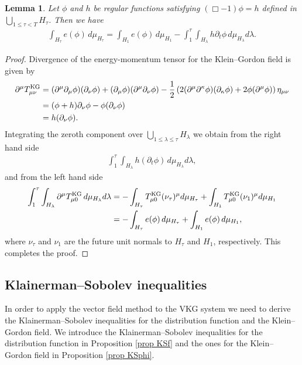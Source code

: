 \documentclass{article}
\newtheorem{lemma}{Lemma}[section]
\newcommand{\rK}{{\rm KG}}
\begin{document}
%
\begin{lemma} \label{lem chiphiest}
Let $ \phi $ and $ h $ be regular functions satisfying $ ( \Box -1 ) \phi = h $ defined in $ \bigcup_{ 1 \leq \tau < T } H_\tau $. Then we have
\begin{align*}
\int_{ H_\tau } e ( \phi ) \, d \mu_{ H_\tau } = \int_{ H_1 } e ( \phi ) \, d \mu_{ H_1 } - \int_1^\tau \int_{ H_\lambda } h \partial_t \phi \, d \mu_{ H_\lambda } d \lambda .
\end{align*}
\end{lemma}
\begin{proof}
Divergence of the energy-momentum tensor for the Klein--Gordon field is given by
\begin{align*}
\partial^\mu T^\rK_{ \mu \nu } & = ( \partial^\mu \partial_\mu \phi ) ( \partial_\nu \phi ) + ( \partial_\mu \phi ) ( \partial^\mu \partial_\nu \phi ) - \frac12 \left( 2 ( \partial^\mu \partial^\kappa \phi ) ( \partial_\kappa \phi ) + 2 \phi ( \partial^\mu \phi ) \right) \eta_{ \mu \nu } \\
& = ( \phi + h ) \partial_\nu \phi - \phi ( \partial_\nu \phi ) \\
& = h ( \partial_\nu \phi ) .
\end{align*}
Integrating the zeroth component over $ \bigcup_{ 1 \leq \lambda \leq \tau } H_\lambda $ we obtain from the right hand side
\begin{align*}
\int_1^\tau \int_{ H_\lambda } h ( \partial_t \phi ) \, d \mu_{ H_\lambda } d \lambda ,
\end{align*}
and from the left hand side
\begin{align*}
\int_1^\tau \int_{ H_\lambda } \partial^\mu T^\rK_{ \mu 0 } \, d \mu_{ H_\lambda } d \lambda & = - \int_{ H_\tau } T^\rK_{ \mu 0 } ( \nu_\tau )^\mu d \mu_{ H_\tau } + \int_{ H_1 } T^\rK_{ \mu 0 } ( \nu_1 )^\mu d \mu_{ H_1 } \\
& = - \int_{ H_\tau } e ( \phi ) \, d \mu_{ H_\tau } + \int_{ H_1 } e ( \phi ) \, d \mu_{ H_1 } ,
\end{align*}
where $ \nu_\tau $ and $ \nu_1 $ are the future unit normals to $ H_\tau $ and $ H_1 $, respectively. This completes the proof.
\end{proof}


%
\subsection{Klainerman--Sobolev inequalities} \label{sec be2}
In order to apply the vector field method to the VKG system we need to derive the Klainerman--Sobolev inequalities for the distribution function and the Klein--Gordon field. We introduce the Klainerman--Sobolev inequalities for the distribution function in Proposition \ref{prop KSf} and the ones for the Klein--Gordon field in Proposition \ref{prop KSphi}.
\end{document}

